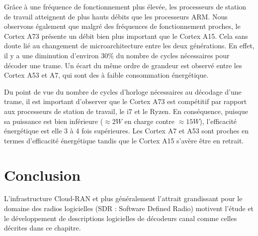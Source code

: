 Grâce à une fréquence de fonctionnement plus élevée, les processeurs de station de travail atteignent de plus hauts débits que les processeurs ARM. Nous observons également que malgré des fréquences de fonctionnement proches, le Cortex A73 présente un débit bien plus important que le Cortex A15. Cela  sans doute lié au changement de microarchitecture entre les deux générations. En effet, il y a une diminution d'environ 30\% du nombre de cycles nécessaires pour décoder une trame. Un écart du même ordre de grandeur est observé entre les Cortex A53 et A7, qui sont des \coeurs à faible consommation énergétique.

Du point de vue du nombre de cycles d'horloge nécessaires au décodage d'une trame, il est important d'observer que le Cortex A73 est compétitif par rapport aux processeurs de station de travail, le i7 et le Ryzen. En conséquence, puisque sa puissance est bien inférieure ($\approx 2 W$ en charge contre $\approx 15 W$), l'efficacité énergétique est elle 3 à 4 fois supérieures. Les Cortex A7 et A53 sont proches en termes d'efficacité énergétique tandis que le Cortex A15 s'avère être en retrait.



\section{Conclusion}

L'infrastructure Cloud-RAN et plus généralement l'attrait grandissant pour le domaine des radios logicielles (SDR : Software Defined Radio) motivent l'étude et le développement de descriptions logicielles de décodeurs canal comme celles décrites dans ce chapitre.

